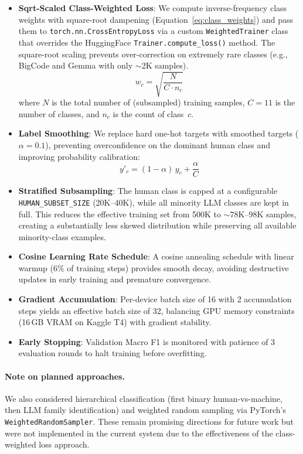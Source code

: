 \documentclass[11pt]{article}
\begin{document}
\begin{itemize}
    \item \textbf{Sqrt-Scaled Class-Weighted Loss}: We compute inverse-frequency class weights with square-root dampening (Equation~\ref{eq:class_weights}) and pass them to \texttt{torch.nn.CrossEntropyLoss} via a custom \texttt{WeightedTrainer} class that overrides the HuggingFace \texttt{Trainer.compute\_loss()} method. The square-root scaling prevents over-correction on extremely rare classes (e.g., BigCode and Gemma with only $\sim$2K samples).
    \begin{equation}
    w_c = \sqrt{\frac{N}{C \cdot n_c}}
    \label{eq:class_weights}
    \end{equation}
    where $N$ is the total number of (subsampled) training samples, $C = 11$ is the number of classes, and $n_c$ is the count of class~$c$.
    \item \textbf{Label Smoothing}: We replace hard one-hot targets with smoothed targets ($\alpha = 0.1$), preventing overconfidence on the dominant human class and improving probability calibration:
    \begin{equation}
    y'_c = (1 - \alpha)\,y_c + \frac{\alpha}{C}
    \end{equation}
    \item \textbf{Stratified Subsampling}: The human class is capped at a configurable \texttt{HUMAN\_SUBSET\_SIZE} (20K--40K), while all minority LLM classes are kept in full. This reduces the effective training set from 500K to $\sim$78K--98K samples, creating a substantially less skewed distribution while preserving all available minority-class examples.
    \item \textbf{Cosine Learning Rate Schedule}: A cosine annealing schedule with linear warmup (6\% of training steps) provides smooth decay, avoiding destructive updates in early training and premature convergence.
    \item \textbf{Gradient Accumulation}: Per-device batch size of 16 with 2 accumulation steps yields an effective batch size of 32, balancing GPU memory constraints (16\,GB VRAM on Kaggle T4) with gradient stability.
    \item \textbf{Early Stopping}: Validation Macro F1 is monitored with patience of 3 evaluation rounds to halt training before overfitting.
\end{itemize}

\paragraph{Note on planned approaches.} We also considered hierarchical classification (first binary human-vs-machine, then LLM family identification) and weighted random sampling via PyTorch's \texttt{WeightedRandomSampler}. These remain promising directions for future work but were not implemented in the current system due to the effectiveness of the class-weighted loss approach.
\end{document}
